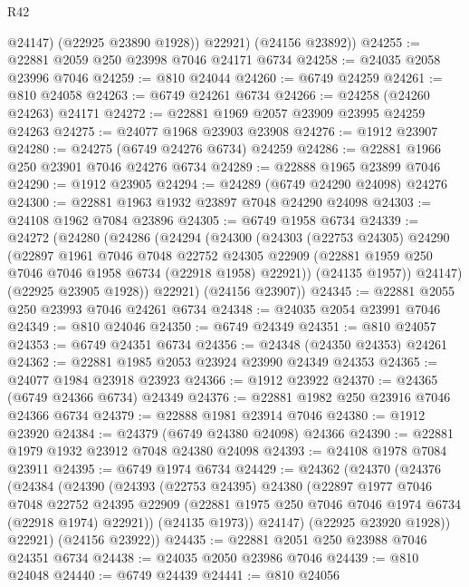 \begin{lexlean}{R42}
\begin{coremodule}
{            @24147)
          (@22925 @23890 @1928))
        @22921)
      (@24156 @23892))
@24255 := @22881 @2059 @250 @23998 @7046 @24171 @6734
@24258 := @24035 @2058 @23996 @7046
@24259 := @810 @24044
@24260 := @6749 @24259
@24261 := @810 @24058
@24263 := @6749 @24261 @6734
@24266 := @24258 (@24260 @24263) @24171
@24272 := @22881 @1969 @2057 @23909 @23995 @24259 @24263
@24275 := @24077 @1968 @23903 @23908
@24276 := @1912 @23907
@24280 := @24275 (@6749 @24276 @6734) @24259
@24286 := @22881 @1966 @250 @23901 @7046 @24276 @6734
@24289 := @22888 @1965 @23899 @7046
@24290 := @1912 @23905
@24294 := @24289 (@6749 @24290 @24098) @24276
@24300 := @22881 @1963 @1932 @23897 @7048 @24290 @24098
@24303 := @24108 @1962 @7084 @23896
@24305 := @6749 @1958 @6734
@24339 := @24272
    (@24280
      (@24286
        (@24294
          (@24300
            (@24303
              (@22753 @24305)
              @24290
              (@22897
                @1961
                @7046
                @7048
                @22752
                @24305
                @22909
                (@22881 @1959 @250 @7046 @7046 @1958 @6734 (@22918 @1958) @22921))
              (@24135 @1957))
            @24147)
          (@22925 @23905 @1928))
        @22921)
      (@24156 @23907))
@24345 := @22881 @2055 @250 @23993 @7046 @24261 @6734
@24348 := @24035 @2054 @23991 @7046
@24349 := @810 @24046
@24350 := @6749 @24349
@24351 := @810 @24057
@24353 := @6749 @24351 @6734
@24356 := @24348 (@24350 @24353) @24261
@24362 := @22881 @1985 @2053 @23924 @23990 @24349 @24353
@24365 := @24077 @1984 @23918 @23923
@24366 := @1912 @23922
@24370 := @24365 (@6749 @24366 @6734) @24349
@24376 := @22881 @1982 @250 @23916 @7046 @24366 @6734
@24379 := @22888 @1981 @23914 @7046
@24380 := @1912 @23920
@24384 := @24379 (@6749 @24380 @24098) @24366
@24390 := @22881 @1979 @1932 @23912 @7048 @24380 @24098
@24393 := @24108 @1978 @7084 @23911
@24395 := @6749 @1974 @6734
@24429 := @24362
    (@24370
      (@24376
        (@24384
          (@24390
            (@24393
              (@22753 @24395)
              @24380
              (@22897
                @1977
                @7046
                @7048
                @22752
                @24395
                @22909
                (@22881 @1975 @250 @7046 @7046 @1974 @6734 (@22918 @1974) @22921))
              (@24135 @1973))
            @24147)
          (@22925 @23920 @1928))
        @22921)
      (@24156 @23922))
@24435 := @22881 @2051 @250 @23988 @7046 @24351 @6734
@24438 := @24035 @2050 @23986 @7046
@24439 := @810 @24048
@24440 := @6749 @24439
@24441 := @810 @24056
}
\end{coremodule}
\end{lexlean}
